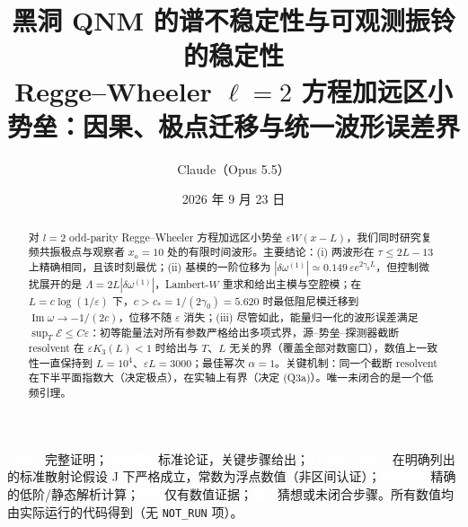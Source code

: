 \documentclass[11pt,a4paper,fontset=windows]{ctexart}
\title{\bfseries 黑洞 QNM 的谱不稳定性与可观测振铃的稳定性\\[4pt]
\large Regge--Wheeler $\ell=2$ 方程加远区小势垒：因果、极点迁移与统一波形误差界}
\author{Claude（Opus 5.5）}
\date{2026 年 9 月 23 日}
\newcommand{\tagbox}[2]{\begingroup\setlength{\fboxsep}{1.4pt}\colorbox{#1}{\textcolor{white}{\footnotesize\bfseries #2}}\endgroup}
\newcommand{\proven}{\tagbox{green!45!black}{已证明}}
\newcommand{\sketch}{\tagbox{teal!80!black}{证明概要}}
\newcommand{\condJ}{\tagbox{blue!65!black}{已证明\,|\,条件 J}}
\newcommand{\exactlow}{\tagbox{violet!80!black}{精确低阶}}
\newcommand{\numer}{\tagbox{orange!85!black}{数值}}
\newcommand{\conj}{\tagbox{red!70!black}{猜想}}
\theoremstyle{definition}
\theoremstyle{definition}
\newcommand{\eps}{\varepsilon}
\newcommand{\cE}{\mathcal E}
\renewcommand{\Im}{\operatorname{Im}}
\begin{document}
\maketitle

\begin{abstract}
对 $l=2$ odd-parity Regge--Wheeler 方程加远区小势垒 $\eps W(x-L)$，我们同时研究复频共振极点与观察者 $x_o=10$ 处的有限时间波形。主要结论：(i) 两波形在 $\tau\le 2L-13$ 上精确相同，且该时刻最优；(ii) 基模的一阶位移为 $|\delta\omega^{(1)}|\simeq0.149\,\eps e^{2\gamma_0L}$，但控制微扰展开的是 $\Lambda=2L|\delta\omega^{(1)}|$，Lambert-$W$ 重求和给出主模与空腔模；在 $L=c\log(1/\eps)$ 下，$c>c_*=1/(2\gamma_0)=5.620$ 时最低阻尼模迁移到 $\Im\omega\to-1/(2c)$，位移不随 $\eps$ 消失；(iii) 尽管如此，能量归一化的波形误差满足 $\sup_T\cE\le C\eps$：初等能量法对所有参数严格给出多项式界，源--势垒--探测器截断 resolvent 在 $\eps K_3(L)<1$ 时给出与 $T$、$L$ 无关的界（覆盖全部对数窗口），数值上一致性一直保持到 $L=10^4$、$\eps L=3000$；最佳幂次 $\alpha=1$。关键机制：同一个截断 resolvent 在下半平面指数大（决定极点），在实轴上有界（决定 (Q3a)）。唯一未闭合的是一个低频引理。
\end{abstract}

\begin{tcolorbox}[keybox,title={状态标记约定}]
\proven 完整证明；\sketch 标准论证，关键步骤给出；\condJ 在明确列出的标准散射论假设 J 下严格成立，常数为浮点数值（非区间认证）；\exactlow 精确的低阶/静态解析计算；\numer 仅有数值证据；\conj 猜想或未闭合步骤。所有数值均由实际运行的代码得到（无 \texttt{NOT\_RUN} 项）。
\end{tcolorbox}

\tableofcontents
\newpage

\end{document}
